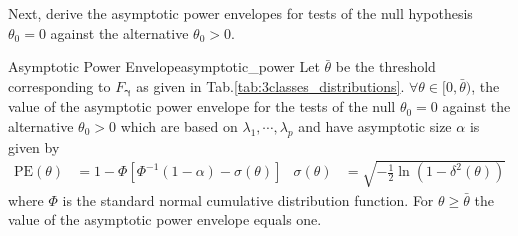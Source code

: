\documentclass[twoside]{article}
\begin{document}
Next, derive the asymptotic power envelopes for tests of the null hypothesis $\theta_0=0$ against the alternative $\theta_0>0$.
\begin{theorem}{Asymptotic Power Envelope}{asymptotic_power}
    Let $\bar{\theta}$ be the threshold corresponding to $F_{\boldsymbol{\gamma}}$ as given in Tab.\ref{tab:3classes_distributions}. $\forall \theta\in [0,\bar{\theta})$, the value of the asymptotic power envelope for the tests of the null $\theta_0 = 0$ against the alternative $\theta_0>0$ which are based on $\lambda_1,\cdots,\lambda_p$ and have asymptotic size $\alpha$ is given by 
    \begin{align*}
        \mathrm{PE}(\theta) &= 1-\Phi \left[\Phi^{-1}(1-\alpha)-\sigma(\theta)\right]& \sigma(\theta) &= \sqrt{-\frac{1}{2} \ln \left(1-\delta^2(\theta)\right)}
    \end{align*}
    where $\Phi$ is the standard normal cumulative distribution function. For $\theta\geq \bar{\theta}$ the value of the asymptotic power envelope equals one.
\end{theorem}
\end{document}
